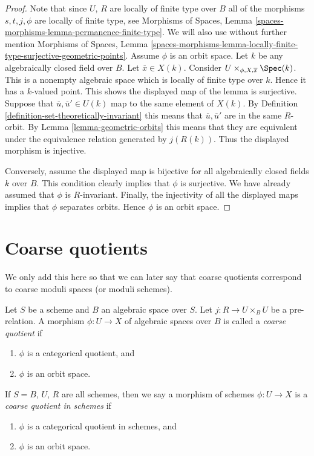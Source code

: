 \begin{proof}
Note that since $U$, $R$ are locally of finite type over $B$ all of the
morphisms $s, t, j, \phi$ are locally of finite type, see
Morphisms of Spaces, Lemma \ref{spaces-morphisms-lemma-permanence-finite-type}.
We will also use without further mention
Morphisms of Spaces, Lemma
\ref{spaces-morphisms-lemma-locally-finite-type-surjective-geometric-points}.
Assume $\phi$ is an orbit space. Let $k$ be any algebraically closed
field over $B$. Let $\overline{x} \in X(k)$. Consider
$U \times_{\phi, X, \overline{x}} \Spec(k)$.
This is a nonempty algebraic space
which is locally of finite type over $k$. Hence it has a $k$-valued point.
This shows the displayed map of the lemma is surjective.
Suppose that $\overline{u}, \overline{u}' \in U(k)$ map to the same
element of $X(k)$. By
Definition \ref{definition-set-theoretically-invariant}
this means that $\overline{u}, \overline{u}'$ are in the same
$R$-orbit. By Lemma \ref{lemma-geometric-orbits} this means that
they are equivalent under the equivalence relation generated by
$j(R(k))$. Thus the displayed morphism is injective.

\medskip\noindent
Conversely, assume the displayed map is bijective for all algebraically
closed fields $k$ over $B$. This condition clearly implies that $\phi$
is surjective. We have already assumed that $\phi$ is $R$-invariant.
Finally, the injectivity of all the displayed maps implies that
$\phi$ separates orbits. Hence $\phi$ is an orbit space.
\end{proof}










\section{Coarse quotients}
\label{section-coarse}

\noindent
We only add this here so that we can later say that coarse quotients
correspond to coarse moduli spaces (or moduli schemes).

\begin{definition}
\label{definition-coarse}
Let $S$ be a scheme and $B$ an algebraic space over $S$.
Let $j : R \to U \times_B U$ be a pre-relation.
A morphism $\phi : U \to X$ of algebraic spaces over $B$
is called a {\it coarse quotient} if
\begin{enumerate}
\item $\phi$ is a categorical quotient, and
\item $\phi$ is an orbit space.
\end{enumerate}
If $S = B$, $U$, $R$ are all schemes, then we say a morphism of schemes
$\phi : U \to X$ is a {\it coarse quotient in schemes} if
\begin{enumerate}
\item $\phi$ is a categorical quotient in schemes, and
\item $\phi$ is an orbit space.
\end{enumerate}
\end{definition}

